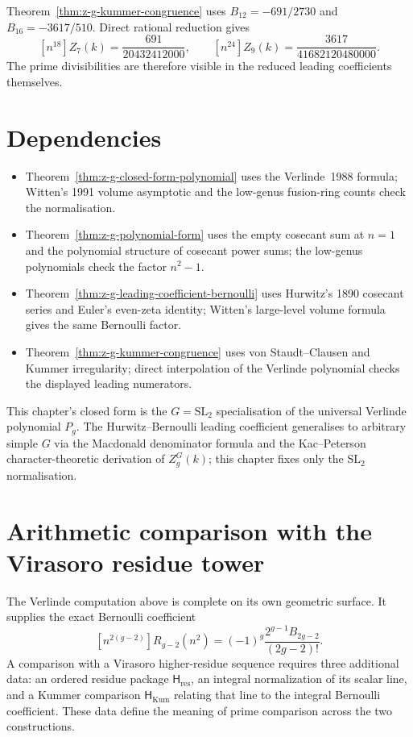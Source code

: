 \begin{remark}
\label{rem:zg-verify-kummer}
Theorem~\ref{thm:z-g-kummer-congruence} uses
$B_{12}=-691/2730$ and $B_{16}=-3617/510$. Direct rational reduction gives
\[
 [n^{18}]Z_7(k)=\frac{691}{20432412000},
 \qquad
 [n^{24}]Z_9(k)=\frac{3617}{41682120480000}.
\]
The prime divisibilities are therefore visible in the reduced leading
coefficients themselves.
\end{remark}

\section{Dependencies}

\begin{itemize}
\item Theorem~\ref{thm:z-g-closed-form-polynomial} uses the
Verlinde~1988 formula; Witten's 1991 volume asymptotic and the
low-genus fusion-ring counts check the normalisation.
\item Theorem~\ref{thm:z-g-polynomial-form} uses the empty cosecant sum
at $n=1$ and the polynomial structure of cosecant power sums; the
low-genus polynomials check the factor $n^2-1$.
\item Theorem~\ref{thm:z-g-leading-coefficient-bernoulli} uses
Hurwitz's 1890 cosecant series and Euler's even-zeta identity; Witten's
large-level volume formula gives the same Bernoulli factor.
\item Theorem~\ref{thm:z-g-kummer-congruence} uses von Staudt--Clausen
and Kummer irregularity; direct interpolation of the Verlinde polynomial
checks the displayed leading numerators.
\end{itemize}

This chapter's closed form is the $G = \mathrm{SL}_2$
specialisation of the universal Verlinde polynomial $P_g$. The
Hurwitz--Bernoulli leading coefficient generalises to arbitrary simple
$G$ via the Macdonald denominator formula and the Kac--Peterson
character-theoretic derivation of $Z_g^G(k)$; this chapter fixes only the
$\mathrm{SL}_2$ normalisation.

\section{Arithmetic comparison with the Virasoro residue tower}
\label{sec:zg-arithmetic-duality}

The Verlinde computation above is complete on its own geometric
surface.  It supplies the exact Bernoulli coefficient
\[
 [n^{2(g-2)}]R_{g-2}(n^2)
 =(-1)^g\frac{2^{g-1}B_{2g-2}}{(2g-2)!}.
\]
A comparison with a Virasoro higher-residue sequence requires three
additional data: an ordered residue package
\(\mathsf H_{\mathrm{res}}\), an integral normalization of its scalar
line, and a Kummer comparison
\(\mathsf H_{\mathrm{Kum}}\) relating that line to the integral
Bernoulli coefficient.  These data define the meaning of prime
comparison across the two constructions.

